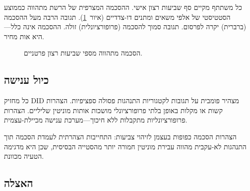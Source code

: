 \documentclass[11pt,a4paper,twocolumn]{article}
\begin{document}
כל משתתף מקיים סף שביעות רצון אישי. ההסכמה המצרפית של הרשת מתהווה כממוצע הסטטיסטי של אלפי משאים ומתנים דו-צדדיים (איור~\ref{fig:consensus}). תגובה הרבה מעל ההסכמה (ברברית) יקרה לפרסום. תגובה סמוך להסכמה (פרופורציונלית) זולה. ההסכמה אינה כלל---היא אות מחיר.

\begin{figure}[ht]
\centering
{}
\caption{הסכמה מתהווה מספי שביעות רצון פרטניים.}
\label{fig:consensus}
\end{figure}

\subsection{כיול ענישה}

כל מחזיק DID מצהיר פומבית על תגובות לקטגוריות התנהגות פסולה ספציפיות. הצהרות קשות או מקלות באופן בלתי פרופורציונלי מושכות אותות מוניטין שליליים. הצהרות פרופורציונליות מתקבלות ללא חיכוך---מערכת ענישה מכיילת-עצמית.

הצהרות הסכמה כפופות בעצמן לזיהוי צביעות: התחייבות הצהרתית לעמדת הסכמה תוך התנהגות לא-עקבית מהווה עבירת מוניטין חמורה יותר מהסטייה הבסיסית, שכן היא מדגימה הטעיה מכוונת.

\subsection{האצלה}
\end{document}
